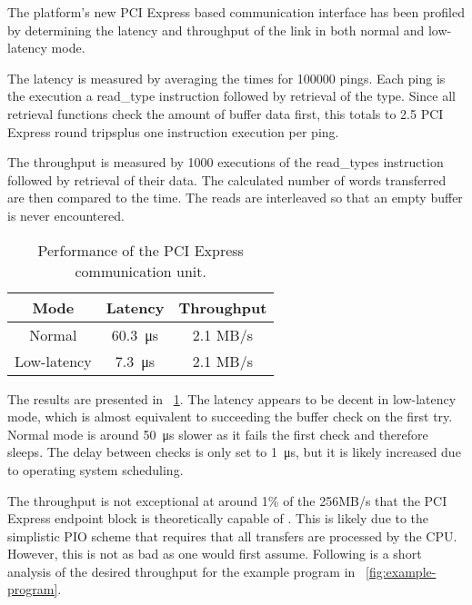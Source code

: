 The platform's new PCI Express based communication interface has been profiled by determining the latency and throughput of the link in both normal and low-latency mode.

The latency is measured by averaging the times for 100000 pings.
Each ping is the execution a read\_type instruction followed by retrieval of the type.
Since all retrieval functions check the amount of buffer data first, this totals to 2.5 PCI Express round trips\footnotemark plus one instruction execution per ping.


The throughput is measured by 1000 executions of the read\_types instruction followed by retrieval of their data.
The calculated number of words transferred are then compared to the time.
The reads are interleaved so that an empty buffer is never encountered.

\begin{table}[!ht]
    \renewcommand{\arraystretch}{1.4}
    \centering
    \begin{tabular}{c|c|c}
        \bfseries Mode & \bfseries Latency & \bfseries Throughput \\
        \hline
        Normal & \SI{60.3}{\micro\second} & 2.1 MB/s \\
        Low-latency & \SI{7.3}{\micro\second} & 2.1 MB/s \\
    \end{tabular}
    \caption[Communication performance]{
        Performance of the PCI Express communication unit.
    }
    \label{tab:communication-performance}
\end{table}

The results are presented in \tablename~\ref{tab:communication-performance}.
The latency appears to be decent in low-latency mode, which is almost equivalent to succeeding the buffer check on the first try.
Normal mode is around \SI{50}{\micro\second} slower as it fails the first check and therefore sleeps.
The delay between checks is only set to \SI{1}{\micro\second}, but it is likely increased due to operating system scheduling.

The throughput is not exceptional at around 1\% of the 256MB/s that the PCI Express endpoint block is theoretically capable of \cite{ug672}.
This is likely due to the simplistic PIO scheme that requires that all transfers are processed by the CPU.
However, this is not as bad as one would first assume.
Following is a short analysis of the desired throughput for the example program in \figurename~\ref{fig:example-program}.

